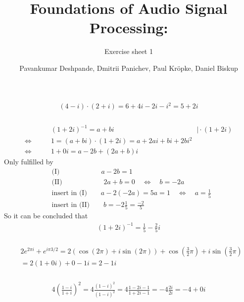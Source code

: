 \documentclass[11pt,a4paper]{scrartcl}
\begin{document}
\author{Pavankumar Deshpande, Dmitrii Panichev, Paul Kröpke, Daniel Biskup}
\title{Foundations of Audio Signal Processing:}
\subtitle{Exercise sheet 1}
\maketitle

\setcounter{section}{1} %
\subsection{} %
\subsubsection{} %
\begin{align}
(4-i)\cdot (2+i)=6+4i-2i-i^2=5+2i
\end{align}

 \subsubsection{} %
\begin{align}
&\qquad(1+2i)^{-1}=a+bi\hspace{5cm}\big|\cdot(1+2i)\\
\Leftrightarrow&\qquad 1=(a+bi)\cdot(1+2i)=a+2ai+bi+2bi^2\\
\Leftrightarrow& \qquad1+0i=a-2b +(2a+b)i
\end{align}
Only fulfilled by
\begin{align}
&\text{(I)}\qquad\qquad\qquad a-2b=1\\
&\text{(II)}\qquad\qquad\qquad 2a+b=0\quad\Leftrightarrow\quad b=-2a\\
&\text{insert in (I)}\qquad a-2(-2a)=5a=1\quad\Leftrightarrow\quad a=\frac{1}{5}\\
&\text{insert in (II)}\qquad b=-2\frac{1}{5}=\frac{-2}{5}
\end{align}
So it can be concluded that
\begin{align}
(1+2i)^{-1}=\frac{1}{5}-\frac{2}{5}i
\end{align}

\subsubsection{}%
\begin{align}
&2e^{2\pi i}+e^{i\pi 3/2}=2(\cos(2\pi)+i\sin(2\pi))+\cos\left(\frac{3}{2}\pi\right)+i\sin\left(\frac{3}{2}\pi\right)\\
&=2(1+0i)+0-1i=2-1i
\end{align}

\subsubsection{} %
\begin{align}
4\left(\frac{1-i}{1+i}\right)^2=4\frac{(1-i)^2}{(1-i)^2}=4\frac{1-2i-1}{1+2i-1}=-4\frac{2i}{2i}=-4+0i
\end{align}
\end{document}

